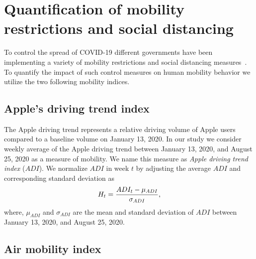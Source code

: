 \documentclass[review]{elsarticle}
\begin{document}


\section{Quantification of mobility restrictions and social distancing}
\label{sec:QMS}
To control the spread of COVID-19 different governments have been implementing a variety of mobility restrictions and social distancing measures~\citep{Charoenwong2020,FANG2020104272,Pan2020,Setti2020}. 
To quantify the impact of such control measures on human mobility behavior we utilize the two following mobility indices.



\subsection{Apple's driving  trend index}

The Apple driving trend represents a relative driving volume of Apple users compared to a baseline volume on January 13, 2020. 
In our study we consider weekly average of the Apple driving trend between January 13, 2020, and August 25, 2020 as a measure of mobility. We name this measure as \textit{Apple driving trend index} ($ADI$). 
We normalize $ADI$ in week $t$ by adjusting the average $ADI$ and corresponding standard deviation as
\begin{eqnarray}\label{eq:Dr}
H_t= {{ADI_t-  \mu_{ADI}} \over {\sigma_{ADI}}},
\end{eqnarray}
where, $\mu_{ADI}$ and $\sigma_{ADI}$ are the mean and standard deviation of $ADI$ between January 13, 2020, and August 25, 2020.


	



\subsection{Air mobility index}
\end{document}
